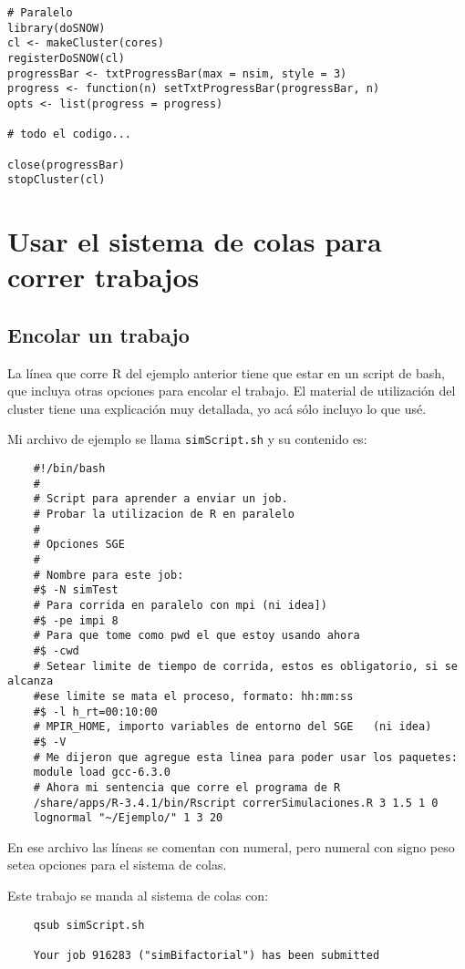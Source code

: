 \documentclass[paper=a4, fontsize=11pt]{article} %
\numberwithin{equation}{section} %
\numberwithin{figure}{section} %
\numberwithin{table}{section} %
\begin{document}
\begin{verbatim}
# Paralelo
library(doSNOW)
cl <- makeCluster(cores)
registerDoSNOW(cl)
progressBar <- txtProgressBar(max = nsim, style = 3)
progress <- function(n) setTxtProgressBar(progressBar, n)
opts <- list(progress = progress)

# todo el codigo...

close(progressBar)
stopCluster(cl)
\end{verbatim}

\section{Usar el sistema de colas para correr trabajos}

\subsection{Encolar un trabajo}

La línea que corre R del ejemplo anterior tiene que estar en un script de bash, que incluya otras opciones para encolar el trabajo. El material de utilización del cluster tiene una explicación muy detallada, yo acá sólo incluyo lo que usé.

Mi archivo de ejemplo se llama \texttt{simScript.sh} y su contenido es:

\begin{verbatim}
	#!/bin/bash
	# 
	# Script para aprender a enviar un job.	
	# Probar la utilizacion de R en paralelo
	#
	# Opciones SGE 
	#
	# Nombre para este job:
	#$ -N simTest
	# Para corrida en paralelo con mpi (ni idea])
	#$ -pe impi 8
	# Para que tome como pwd el que estoy usando ahora
	#$ -cwd
	# Setear limite de tiempo de corrida, estos es obligatorio, si se alcanza 
	#ese limite se mata el proceso, formato: hh:mm:ss
	#$ -l h_rt=00:10:00
	# MPIR_HOME, importo variables de entorno del SGE	(ni idea)
	#$ -V
	# Me dijeron que agregue esta linea para poder usar los paquetes:
	module load gcc-6.3.0
	# Ahora mi sentencia que corre el programa de R
	/share/apps/R-3.4.1/bin/Rscript correrSimulaciones.R 3 1.5 1 0 
	lognormal "~/Ejemplo/" 1 3 20
\end{verbatim}

En ese archivo las líneas se comentan con numeral, pero numeral con signo peso setea opciones para el sistema de colas.

Este trabajo se manda al sistema de colas con:

\begin{verbatim}
	qsub simScript.sh
	
	Your job 916283 ("simBifactorial") has been submitted
\end{verbatim}
\end{document}
